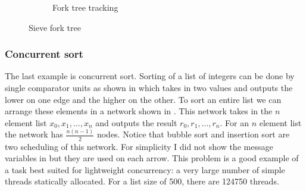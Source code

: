 \documentclass[12pt,twoside,notitlepage]{report}
\theoremstyle{plain}%
\theoremstyle{definition}
\theoremstyle{remark}
\begin{document}
\begin{figure}
\begin{subfigure}[b]{0.45\linewidth}
\caption{Fork tree tracking}
\label{fig:sieve_ftt}
\end{subfigure}
%

%
%

%
\caption{Sieve fork tree}
\label{fig:sieve_fork_tree}
\end{figure}








\subsubsection{Concurrent sort}
The last example is concurrent sort. Sorting of a list of integers can be done by single comparator units as shown in  which takes in two values and outputs the lower on one edge and the higher on the other. To sort an entire list we can arrange these elements in a network shown in . This network takes in the $ n $ element list $ x_0, x_1, \dots, x_n $ and outputs the result $ r_0, r_1, \dots, r_n $. For an $ n $ element list the network has $ \frac{n(n-1)}{2} $ nodes. Notice that bubble sort and insertion sort are two scheduling of this network. For simplicity I did not show the message variables in  but they are used on each arrow. This problem is a good example of a task best suited for lightweight concurrency: a very large number of simple threads statically allocated. For a list size of 500, there are 124750 threads. 
\end{document}
